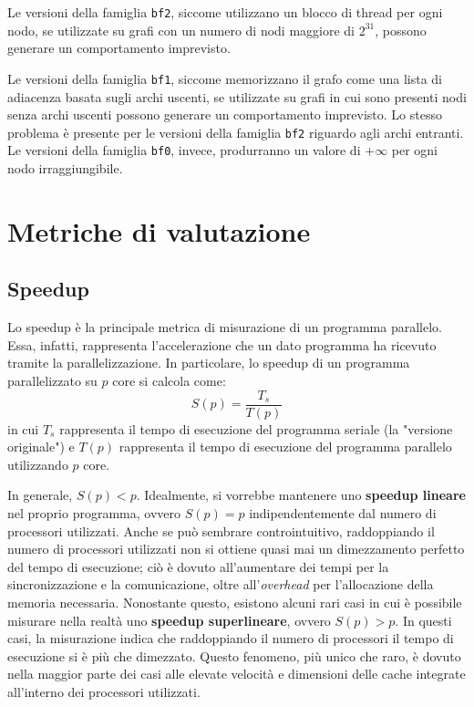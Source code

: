 \documentclass[12pt,a4paper]{book}
\begin{document}
	Le versioni della famiglia \texttt{bf2}, siccome utilizzano un blocco di thread per ogni nodo, se utilizzate su grafi con un numero di nodi maggiore di $2^{31}$, possono generare un comportamento imprevisto.
	
	Le versioni della famiglia \texttt{bf1}, siccome memorizzano il grafo come una lista di adiacenza basata sugli archi uscenti, se utilizzate su grafi in cui sono presenti nodi senza archi uscenti possono generare un comportamento imprevisto. Lo stesso problema è presente per le versioni della famiglia \texttt{bf2} riguardo agli archi entranti. Le versioni della famiglia \texttt{bf0}, invece, produrranno un valore di $+\infty$ per ogni nodo irraggiungibile.
	
	\chapter{Metriche di valutazione}
	\label{section:metriche}
	\section{Speedup}
	Lo speedup è la principale metrica di misurazione di un programma parallelo. Essa, infatti, rappresenta l'accelerazione che un dato programma ha ricevuto tramite la parallelizzazione. In particolare, lo speedup di un programma parallelizzato su $p$ core si calcola come:
	\begin{equation}
		S(p) = \frac{T_s}{T(p)}
		\label{eq:speedup}
	\end{equation}
	in cui $T_s$ rappresenta il tempo di esecuzione del programma seriale (la "versione originale") e $T(p)$ rappresenta il tempo di esecuzione del programma parallelo utilizzando $p$ core.
	
	In generale, $S(p) < p$. Idealmente, si vorrebbe mantenere uno \textbf{speedup lineare} nel proprio programma, ovvero $S(p) = p$ indipendentemente dal numero di processori utilizzati. Anche se può sembrare controintuitivo, raddoppiando il numero di processori utilizzati non si ottiene quasi mai un dimezzamento perfetto del tempo di esecuzione; ciò è dovuto all'aumentare dei tempi per la sincronizzazione e la comunicazione, oltre all'\textit{overhead} per l'allocazione della memoria necessaria. Nonostante questo, esistono alcuni rari casi in cui è possibile misurare nella realtà uno \textbf{speedup superlineare}, ovvero $S(p) > p$. In questi casi, la misurazione indica che raddoppiando il numero di processori il tempo di esecuzione si è più che dimezzato. Questo fenomeno, più unico che raro, è dovuto nella maggior parte dei casi alle elevate velocità e dimensioni delle cache integrate all'interno dei processori utilizzati.
	
\end{document}
